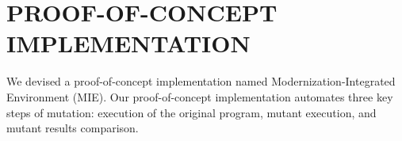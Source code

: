 \documentclass[a4paper,twoside]{article}
\newcommand*\circled[1]{\tikz[baseline=(char.base)]{
  \node[shape=circle,draw, inner sep=0.1pt] (char) {#1};}
}
\begin{document}





\section{\uppercase{Proof-of-concept implementation}}

We devised a proof-of-concept implementation named Modernization-Integrated Environment (MIE). Our proof-of-concept implementation automates three key steps of mutation: execution of the original program, mutant execution, and mutant results comparison. 

















\end{document}
